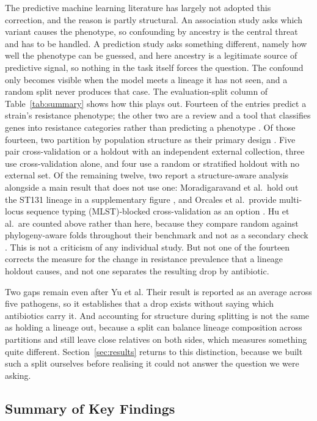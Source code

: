 \documentclass[journal]{IEEEtran}
\begin{document}
The predictive machine learning literature has largely not adopted this correction,
and the reason is partly structural. An association study asks which variant causes
the phenotype, so confounding by ancestry is the central threat and has to be
handled. A prediction study asks something different, namely how well the phenotype
can be guessed, and here ancestry is a legitimate source of predictive signal, so
nothing in the task itself forces the question. The confound only becomes visible
when the model meets a lineage it has not seen, and a random split never produces
that case. The evaluation-split column of Table~\ref{tab:summary} shows how this
plays out. Fourteen of the entries predict a strain's resistance phenotype; the
other two are a review \cite{Yun2024} and a tool that classifies genes into
resistance categories rather than predicting a phenotype
\cite{ArangoArgoty2018}. Of those fourteen, two partition by population structure
as their primary design \cite{Yu2025,Hu2024}. Five pair cross-validation or
a holdout with an independent external collection, three use cross-validation
alone, and four use a random or stratified holdout with no external set. Of the
remaining twelve, two report a structure-aware analysis alongside a main result that
does not use one: Moradigaravand et al.\ hold out the ST131 lineage in a
supplementary figure \cite{moradigaravand2018}, and Orcales et al.\ provide
multi-locus sequence typing (MLST)-blocked cross-validation as an option
\cite{Orcales2024}. Hu et al.\ are counted above rather than here, because they
compare random against phylogeny-aware folds throughout their benchmark and not as a
secondary check \cite{Hu2024}. This is not a criticism of any individual study. But not one of the fourteen corrects the measure for the change
in resistance prevalence that a lineage holdout causes, and not one separates the
resulting drop by antibiotic.

Two gaps remain even after Yu et al. Their result is reported as an average across
five pathogens, so it establishes that a drop exists without saying which
antibiotics carry it. And accounting for structure during splitting is not the same
as holding a lineage out, because a split can balance lineage composition across
partitions and still leave close relatives on both sides, which measures something
quite different. Section~\ref{sec:results} returns to this distinction, because we
built such a split ourselves before realising it could not answer the question we
were asking.

\subsection{Summary of Key Findings}
\end{document}
